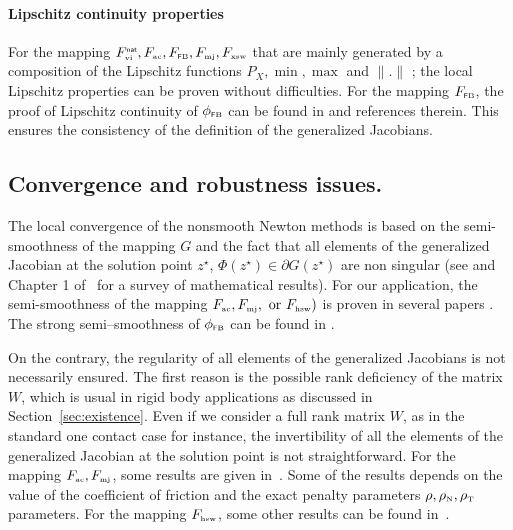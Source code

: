\paragraph{Lipschitz continuity properties} For the mapping $F^{\hbox{\sf \tiny{nat}}}_{\hbox{\tiny{vi}}}, F_{\hbox{\tiny{ac}}}, F_{{\hbox{\tiny{\textsf FB}}}}, F_{{\hbox{\tiny{mj}}}}, F_{{\hbox{\tiny{xsw}}}}$ that are mainly generated by a composition of the Lipschitz functions $P_X,\min,\max$ and $\|.\|$ ; the local Lipschitz properties can be proven without difficulties. For the mapping  $F_{{\hbox{\tiny{\textsf FB}}}}$, the proof of Lipschitz continuity of $\phi_{\hbox{\tiny{\textsf FB}}}$ can be found in \citep{Sun.Sun_MP2005} and references therein. This ensures the consistency of the definition of the generalized Jacobians.


\subsection{Convergence and robustness issues.}


The local convergence of the nonsmooth Newton methods is based on the semi-smoothness of the mapping $G$ and the fact that all elements of the generalized Jacobian at the solution point $z^\star$,  $\Phi(z^\star) \in \partial G(z^\star)$ are non singular (see \cite{Qi.Sun1993} and Chapter 1 of~\cite{Qi.ea_Book2018} for a survey of mathematical results). For our application, the semi-smoothness of the mapping $F_{\hbox{\tiny{ac}}},  F_{{\hbox{\tiny{mj}}}},  \text{ or } F_{\hbox{\tiny{hsw}}}) $ is proven in several papers \cite{Christensen.Pang1998,Hueber.ea_SJSC2008}. The strong semi--smoothness of $\phi_{\hbox{\tiny{\textsf FB}}}$ can be found in \citep{Sun.Sun_MP2005}.

On the contrary, the regularity of all elements of the generalized Jacobians is not necessarily ensured. The first reason is the possible rank deficiency of the matrix $W$, which is usual in rigid body applications as discussed in Section~\ref{sec:existence}. Even if we consider a full rank matrix $W$, as in the standard one contact case for instance, the invertibility of all the elements of the generalized Jacobian at the solution point is not straightforward. For the mapping $F_{\hbox{\tiny{ac}}},  F_{{\hbox{\tiny{mj}}}}$, some results are given in~\cite{Alart1993,Alart95,Jourdan.Alart.ea98}. Some of the results depends on the value of the coefficient of friction and the exact penalty parameters  $\rho, \rho_{\hbox{\tiny{N}}}, \rho_{\hbox{\tiny{T}}}$ parameters. For the mapping $F_{\hbox{\tiny{hsw}}}$, some other results can be found in~\cite{Hueber.ea_SJSC2008}.

